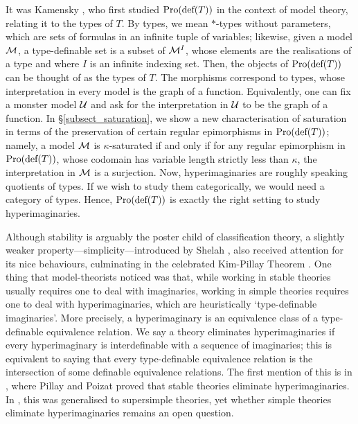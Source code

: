 \smallskip

It was Kamensky \cite{KAMENSKY2007180}, who first studied $\textup{Pro}(\textup{def}(T))$ in the context of model theory, relating it to the types of $T$. By types, we mean $\ast$-types without parameters, which are sets of formulas in an infinite tuple of variables; likewise, given a model $\mathcal{M}$, a type-definable set is a subset of $\mathcal{M}^I$, whose elements are the realisations of a type and where $I$ is an infinite indexing set. Then, the objects of $\textup{Pro}(\textup{def}(T))$ can be thought of as the types of $T$. The morphisms correspond to types, whose interpretation in every model is the graph of a function. Equivalently, one can fix a monster model $\mathcal{U}$ and ask for the interpretation in $\mathcal{U}$ to be the graph of a function. In \S\ref{subsect_saturation}, we show a new characterisation of saturation in terms of the preservation of certain regular epimorphisms in $\textup{Pro}(\textup{def}(T))$; namely, a model $\mathcal{M}$ is $\kappa$-saturated if and only if for any regular epimorphism in $\textup{Pro}(\textup{def}(T))$, whose codomain has variable length strictly less than $\kappa$, the interpretation in $\mathcal{M}$ is a surjection. Now, hyperimaginaries are roughly speaking quotients of types. If we wish to study them categorically, we would need a category of types. Hence, $\textup{Pro}(\textup{def}(T))$ is exactly the right setting to study hyperimaginaries.

\smallskip

Although stability is arguably the poster child of classification theory, a slightly weaker property---simplicity---introduced by Shelah \cite{SHELAH1980177}, also received attention for its nice behaviours, culminating in the celebrated Kim-Pillay Theorem \cite{KIM1997149}. One thing that model-theorists noticed was that, while working in stable theories usually requires one to deal with imaginaries, working in simple theories requires one to deal with hyperimaginaries, which are heuristically `type-definable imaginaries'. More precisely, a hyperimaginary is an equivalence class of a type-definable equivalence relation. We say a theory eliminates hyperimaginaries if every hyperimaginary is interdefinable with a sequence of imaginaries; this is equivalent to saying that every type-definable equivalence relation is the intersection of some definable equivalence relations. The first mention of this is in \cite{Pillay_Poizat_1987}, where Pillay and Poizat proved that stable theories eliminate hyperimaginaries. In \cite{BuechlerSteven2001St}, this was generalised to supersimple theories, yet whether simple theories eliminate hyperimaginaries remains an open question. 

